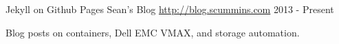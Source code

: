 


\begin{cventries}


\cventry
{Jekyll on Github Pages} %
{Sean's Blog} %
{ \href{http://blog.scummins.com}{http://blog.scummins.com} } %
{2013 - Present} %
{ %
\begin{cvitems}
\item {Blog posts on containers, Dell EMC VMAX, and storage automation.}
\end{cvitems}
}


\end{cventries}